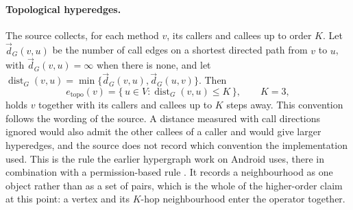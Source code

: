 \paragraph{Topological hyperedges.} The source collects, for each method $v$, its callers and
callees up to order $K$. Let $\vec{d}_G(v,u)$ be the number of call edges on a shortest directed
path from $v$ to $u$, with $\vec{d}_G(v,u) = \infty$ when there is none, and let
$\operatorname{dist}_G(v,u) = \min\{\vec{d}_G(v,u), \vec{d}_G(u,v)\}$. Then
\begin{equation}
  e_{\text{topo}}(v) = \{\, u \in V : \operatorname{dist}_G(v, u) \le K \,\}, \qquad K = 3 ,
  \label{eq:hgann:topo}
\end{equation}
holds $v$ together with its callers and callees up to $K$ steps away. This convention follows the
wording of the source. A distance measured with call directions ignored would also admit the other
callees of a caller and would give larger hyperedges, and the source does not record which
convention the implementation used.
This is the rule the earlier hypergraph work on Android uses, there in combination with a
permission-based rule \cite{zhang2023android}. It records a neighbourhood as one object rather
than as a set of pairs, which is the whole of the higher-order claim at this point: a vertex and
its $K$-hop neighbourhood enter the operator together.

